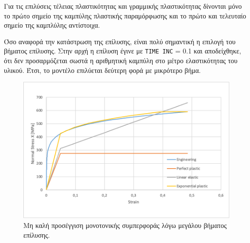 \documentclass{article}
\begin{document}
Για τις επιλύσεις τέλειας πλαστικότητας και γραμμικής πλαστικότητας δίνονται μόνο το πρώτο σημείο της καμπύλης πλαστικής παραμόρφωσης και το πρώτο και τελευταίο σημείο της καμπλύλης αντίστοιχα. 
\par Όσο αναφορά την κατάστρωση της επίλυσης, είναι πολύ σημαντική η επιλογή του βήματος επίλυσης. Στην αρχή η επίλυση έγινε με \texttt{TIME INC} = 0.1 και αποδείχθηκε, ότι δεν προσαρμόζεται σωστά η αριθμητική καμπύλη στο μέτρο ελαστικότητας του υλικού. Έτσι, το μοντέλο επιλύεται δεύτερη φορά με μικρότερο βήμα.
\begin{figure}[H]
    \centering
    \includegraphics[width=0.8\linewidth]{media/static-false.png}
    \caption{Μη καλή προσέγγιση μονοτονικής συμπερφοράς λόγω μεγάλου βήματος επίλυσης.}
    \label{fig:statfalse}
\end{figure}
\end{document}
